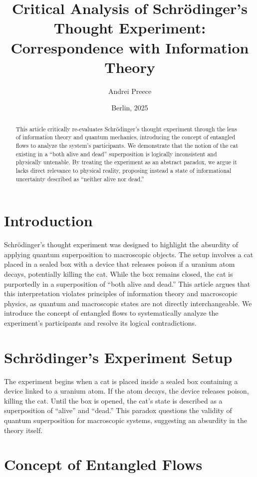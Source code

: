 \documentclass[12pt]{article}
\title{Critical Analysis of Schrödinger's Thought Experiment:\\
Correspondence with Information Theory}
\author{Andrei Preece}
\date{Berlin, 2025}
\begin{document}
\maketitle

\begin{abstract}
This article critically re-evaluates Schrödinger's thought experiment through the lens of information theory and quantum mechanics, introducing the concept of entangled flows to analyze the system's participants. We demonstrate that the notion of the cat existing in a ``both alive and dead'' superposition is logically inconsistent and physically untenable. By treating the experiment as an abstract paradox, we argue it lacks direct relevance to physical reality, proposing instead a state of informational uncertainty described as ``neither alive nor dead.''
\end{abstract}

\section{Introduction}

Schrödinger's thought experiment was designed to highlight the absurdity of applying quantum superposition to macroscopic objects. The setup involves a cat placed in a sealed box with a device that releases poison if a uranium atom decays, potentially killing the cat. While the box remains closed, the cat is purportedly in a superposition of ``both alive and dead.'' This article argues that this interpretation violates principles of information theory and macroscopic physics, as quantum and macroscopic states are not directly interchangeable. We introduce the concept of entangled flows to systematically analyze the experiment's participants and resolve its logical contradictions.

\section{Schrödinger's Experiment Setup}

The experiment begins when a cat is placed inside a sealed box containing a device linked to a uranium atom. If the atom decays, the device releases poison, killing the cat. Until the box is opened, the cat's state is described as a superposition of ``alive'' and ``dead.'' This paradox questions the validity of quantum superposition for macroscopic systems, suggesting an absurdity in the theory itself.

\section{Concept of Entangled Flows}
\end{document}
